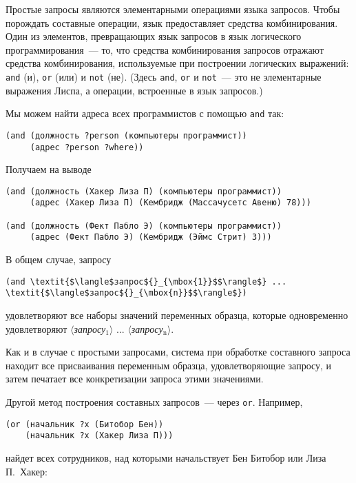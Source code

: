 Простые запросы являются элементарными 
операциями языка
запросов.  Чтобы порождать составные операции, язык предоставляет
средства комбинирования.  Один из элементов, превращающих язык
запросов в язык логического программирования~--- то, что средства
комбинирования запросов отражают средства комбинирования, используемые
при построении логических выражений: {\tt and} (и),
{\tt or} (или) и {\tt not} (не).  (Здесь
{\tt and}, {\tt or} и {\tt not}~--- это не
элементарные выражения Лиспа, а операции, встроенные в язык
запросов.)

Мы можем найти адреса всех программистов с помощью
{\tt and} так:

\begin{Verbatim}[fontsize=\small]
(and (должность ?person (компьютеры программист))
     (адрес ?person ?where))
\end{Verbatim}
Получаем на выводе

\begin{Verbatim}[fontsize=\small]
(and (должность (Хакер Лиза П) (компьютеры программист))
     (адрес (Хакер Лиза П) (Кембридж (Массачусетс Авеню) 78)))

(and (должность (Фект Пабло Э) (компьютеры программист))
     (адрес (Фект Пабло Э) (Кембридж (Эймс Стрит) 3)))
\end{Verbatim}
В общем случае, запросу

\begin{Verbatim}[fontsize=\small]
(and \textit{$\langle$запрос${}_{\mbox{1}}$$\rangle$} ... \textit{$\langle$запрос${}_{\mbox{n}}$$\rangle$})
\end{Verbatim}
удовлетворяют все наборы значений переменных образца, которые
одновременно удовлетворяют \textit{$\langle$запросу${}_{\mbox{1}}$$\rangle$} 
... \textit{$\langle$запросу${}_{\mbox{n}}$$\rangle$}.

Как и в случае с простыми запросами, система при
обработке составного запроса находит все присваивания переменным
образца, удовлетворяющие запросу, и затем печатает все
конкретизации запроса этими значениями.

Другой метод построения составных запросов~--- через
{\tt or}.  Например,

\begin{Verbatim}[fontsize=\small]
(or (начальник ?x (Битобор Бен))
    (начальник ?x (Хакер Лиза П)))
\end{Verbatim}
найдет всех сотрудников, над которыми начальствует Бен Битобор или
Лиза П.~Хакер:

